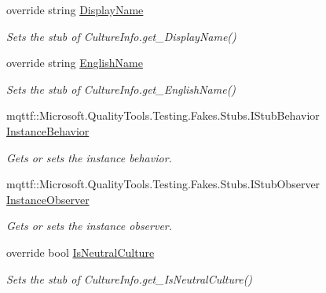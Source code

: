 \begin{DoxyCompactItemize}
override string \hyperlink{class_system_1_1_globalization_1_1_fakes_1_1_stub_culture_info_a9e0d79917943dee79b8dbe7bca661dd0}{Display\-Name}
\begin{DoxyCompactList}\small\item\em Sets the stub of Culture\-Info.\-get\-\_\-\-Display\-Name()\end{DoxyCompactList}\item 
override string \hyperlink{class_system_1_1_globalization_1_1_fakes_1_1_stub_culture_info_a96c5f0873a53babbdaf8c827a86b9b82}{English\-Name}
\begin{DoxyCompactList}\small\item\em Sets the stub of Culture\-Info.\-get\-\_\-\-English\-Name()\end{DoxyCompactList}\item 
mqttf\-::\-Microsoft.\-Quality\-Tools.\-Testing.\-Fakes.\-Stubs.\-I\-Stub\-Behavior \hyperlink{class_system_1_1_globalization_1_1_fakes_1_1_stub_culture_info_a225f159f9e948b82b5ae14ca4c2e5791}{Instance\-Behavior}
\begin{DoxyCompactList}\small\item\em Gets or sets the instance behavior.\end{DoxyCompactList}\item 
mqttf\-::\-Microsoft.\-Quality\-Tools.\-Testing.\-Fakes.\-Stubs.\-I\-Stub\-Observer \hyperlink{class_system_1_1_globalization_1_1_fakes_1_1_stub_culture_info_a6b7cb5bc79c7f118c67d1cef2a02b3c8}{Instance\-Observer}
\begin{DoxyCompactList}\small\item\em Gets or sets the instance observer.\end{DoxyCompactList}\item 
override bool \hyperlink{class_system_1_1_globalization_1_1_fakes_1_1_stub_culture_info_a3f78796ed5c3254be1b14d5ceffa6363}{Is\-Neutral\-Culture}
\begin{DoxyCompactList}\small\item\em Sets the stub of Culture\-Info.\-get\-\_\-\-Is\-Neutral\-Culture()\end{DoxyCompactList}\item 

\end{DoxyCompactItemize}
